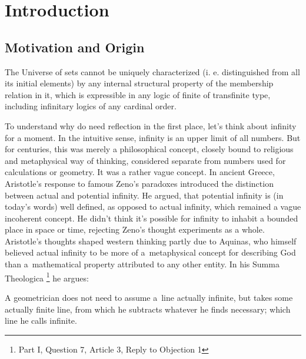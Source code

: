 \section{Introduction}\label{sec:introduction}

\subsection{Motivation and Origin}
\begin{displayquote}
The Universe of sets cannot be uniquely characterized (i. e. distinguished from all its initial elements) by any internal structural property of the membership relation in it, which is expressible in any logic of finite of transfinite type, including infinitary logics of any cardinal order.
\end{displayquote}

To understand why do need reflection in the first place, let's think about infinity for a moment. In the intuitive sense, infinity is an upper limit of all numbers. But for centuries, this was merely a philosophical concept, closely bound to religious and metaphysical way of thinking, 
considered separate from numbers used for calculations or geometry. It was a rather vague concept. 
In ancient Greece, Aristotle's response to famous Zeno's paradoxes introduced the distinction between actual and potential infinity.
He argued, that potential infinity is (in today's words) well defined, as opposed to actual infinity, which remained a vague incoherent concept. He didn't think it's possible for infinity to inhabit a bounded place in space or time, rejecting Zeno's thought experiments as a whole. 
Aristotle's thoughts shaped western thinking partly due to Aquinas, who himself believed actual infinity to be more of a~metaphysical concept for describing God than a~mathematical property attributed to any other entity. In his Summa Theologica \footnote{Part I, Question 7, Article 3, Reply to Objection 1} he argues:
\begin{displayquote}
A geometrician does not need to assume a~line actually infinite, but takes some actually finite line, from which he subtracts whatever he finds necessary; which line he calls infinite.
\end{displayquote} %

